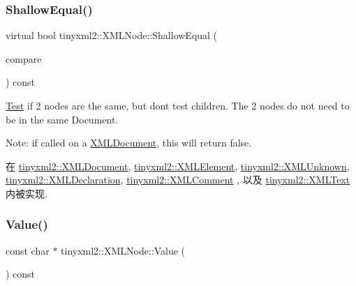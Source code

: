 \mbox{\label{classtinyxml2_1_1_x_m_l_node_a7ce18b751c3ea09eac292dca264f9226}} 
\subsubsection{\texorpdfstring{Shallow\+Equal()}{ShallowEqual()}}
{\footnotesize\ttfamily virtual bool tinyxml2\+::\+X\+M\+L\+Node\+::\+Shallow\+Equal (\begin{DoxyParamCaption}\item[{const \hyperlink{classtinyxml2_1_1_x_m_l_node}{X\+M\+L\+Node} $\ast$}]{compare }\end{DoxyParamCaption}) const\hspace{0.3cm}{\ttfamily [pure virtual]}}

\hyperlink{class_test}{Test} if 2 nodes are the same, but don\textquotesingle{}t test children. The 2 nodes do not need to be in the same Document.

Note\+: if called on a \hyperlink{classtinyxml2_1_1_x_m_l_document}{X\+M\+L\+Document}, this will return false. 

在 \hyperlink{classtinyxml2_1_1_x_m_l_document_a6fe5ef18699091844fcf64b56ffa5bf9}{tinyxml2\+::\+X\+M\+L\+Document}, \hyperlink{classtinyxml2_1_1_x_m_l_element_a61ffd7bf918a9db4aa6203d855ac5ec2}{tinyxml2\+::\+X\+M\+L\+Element}, \hyperlink{classtinyxml2_1_1_x_m_l_unknown_ac46767cd721d666e690a6231dfb618d1}{tinyxml2\+::\+X\+M\+L\+Unknown}, \hyperlink{classtinyxml2_1_1_x_m_l_declaration_ae8b4d3a399857029f36c322b0801b69c}{tinyxml2\+::\+X\+M\+L\+Declaration}, \hyperlink{classtinyxml2_1_1_x_m_l_comment_a965d880a99d58dd915caa88dc37a9b51}{tinyxml2\+::\+X\+M\+L\+Comment} , 以及 \hyperlink{classtinyxml2_1_1_x_m_l_text_a99d8bce4dc01df889126e047f358cdfc}{tinyxml2\+::\+X\+M\+L\+Text} 内被实现.

\mbox{\label{classtinyxml2_1_1_x_m_l_node_a0485e51c670e741884cfd8362274d680}} 
\subsubsection{\texorpdfstring{Value()}{Value()}}
{\footnotesize\ttfamily const char $\ast$ tinyxml2\+::\+X\+M\+L\+Node\+::\+Value (\begin{DoxyParamCaption}{ }\end{DoxyParamCaption}) const}

